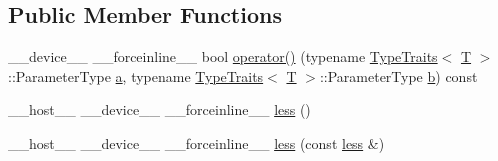 \subsection*{Public Member Functions}
\begin{DoxyCompactItemize}
\item 
\-\_\-\-\_\-device\-\_\-\-\_\- \-\_\-\-\_\-forceinline\-\_\-\-\_\- bool \hyperlink{structcv_1_1gpu_1_1device_1_1less_aa081b007ea54daddc37981f8097229a8}{operator()} (typename \hyperlink{structcv_1_1gpu_1_1device_1_1TypeTraits}{Type\-Traits}$<$ \hyperlink{calib3d_8hpp_a3efb9551a871ddd0463079a808916717}{T} $>$\-::Parameter\-Type \hyperlink{legacy_8hpp_a1031d0e0a97a340abfe0a6ab9e831045}{a}, typename \hyperlink{structcv_1_1gpu_1_1device_1_1TypeTraits}{Type\-Traits}$<$ \hyperlink{calib3d_8hpp_a3efb9551a871ddd0463079a808916717}{T} $>$\-::Parameter\-Type \hyperlink{legacy_8hpp_ac04272e8ca865b8fba18d36edae9fd2a}{b}) const 
\item 
\-\_\-\-\_\-host\-\_\-\-\_\- \-\_\-\-\_\-device\-\_\-\-\_\- \-\_\-\-\_\-forceinline\-\_\-\-\_\- \hyperlink{structcv_1_1gpu_1_1device_1_1less_a29f84656aab785aa7f7d13d5014d2ef2}{less} ()
\item 
\-\_\-\-\_\-host\-\_\-\-\_\- \-\_\-\-\_\-device\-\_\-\-\_\- \-\_\-\-\_\-forceinline\-\_\-\-\_\- \hyperlink{structcv_1_1gpu_1_1device_1_1less_a3e2258fac4aaffeb69b6c1ac5f0caff9}{less} (const \hyperlink{structcv_1_1gpu_1_1device_1_1less}{less} \&)
\end{DoxyCompactItemize}


